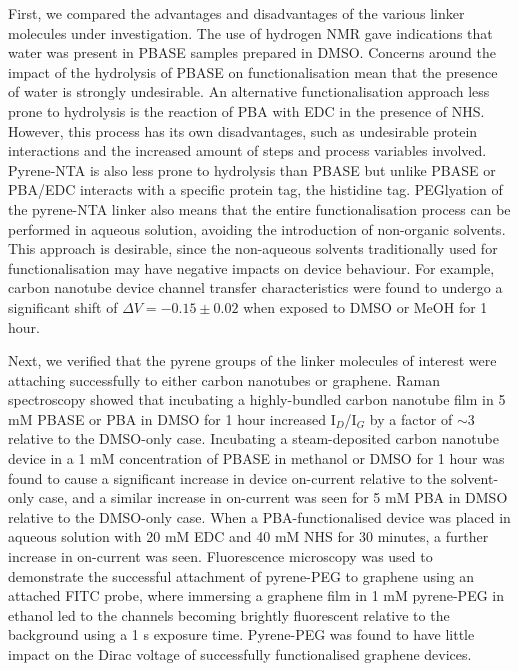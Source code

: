 \documentclass[
  a4paper,
]{scrbook}
\begin{document}
First, we compared the advantages and disadvantages of the various
linker molecules under investigation. The use of hydrogen NMR gave
indications that water was present in PBASE samples prepared in DMSO.
Concerns around the impact of the hydrolysis of PBASE on
functionalisation mean that the presence of water is strongly
undesirable. An alternative functionalisation approach less prone to
hydrolysis is the reaction of PBA with EDC in the presence of NHS.
However, this process has its own disadvantages, such as undesirable
protein interactions and the increased amount of steps and process
variables involved. Pyrene-NTA is also less prone to hydrolysis than
PBASE but unlike PBASE or PBA/EDC interacts with a specific protein tag,
the histidine tag. PEGlyation of the pyrene-NTA linker also means that
the entire functionalisation process can be performed in aqueous
solution, avoiding the introduction of non-organic solvents. This
approach is desirable, since the non-aqueous solvents traditionally used
for functionalisation may have negative impacts on device behaviour. For
example, carbon nanotube device channel transfer characteristics were
found to undergo a significant shift of \(\Delta V = -0.15 \pm 0.02\)
when exposed to DMSO or MeOH for 1 hour.

Next, we verified that the pyrene groups of the linker molecules of
interest were attaching successfully to either carbon nanotubes or
graphene. Raman spectroscopy showed that incubating a highly-bundled
carbon nanotube film in 5 mM PBASE or PBA in DMSO for 1 hour increased
I\(_D\)/I\(_G\) by a factor of \(\sim 3\) relative to the DMSO-only
case. Incubating a steam-deposited carbon nanotube device in a 1 mM
concentration of PBASE in methanol or DMSO for 1 hour was found to cause
a significant increase in device on-current relative to the solvent-only
case, and a similar increase in on-current was seen for 5 mM PBA in DMSO
relative to the DMSO-only case. When a PBA-functionalised device was
placed in aqueous solution with 20 mM EDC and 40 mM NHS for 30 minutes,
a further increase in on-current was seen. Fluorescence microscopy was
used to demonstrate the successful attachment of pyrene-PEG to graphene
using an attached FITC probe, where immersing a graphene film in 1 mM
pyrene-PEG in ethanol led to the channels becoming brightly fluorescent
relative to the background using a 1 s exposure time. Pyrene-PEG was
found to have little impact on the Dirac voltage of successfully
functionalised graphene devices.
\end{document}
